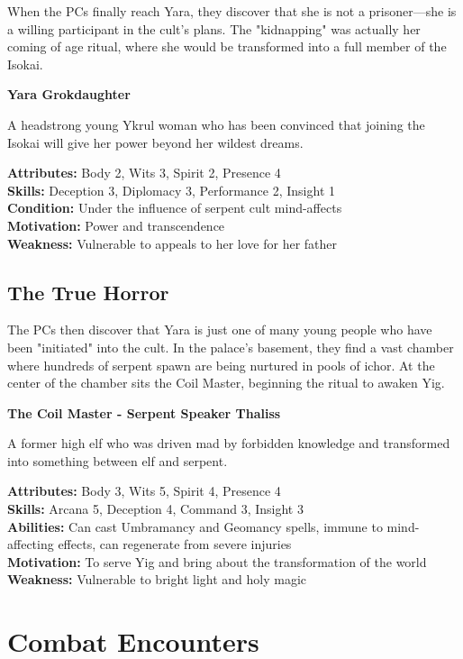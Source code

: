 \documentclass[12pt,twoside]{article}
\newenvironment{npcbox}[1]{
  \begin{mdframed}[
    linewidth=1pt,
    linecolor=dungeongray,
    backgroundcolor=white,
    innertopmargin=5pt,
    innerbottommargin=5pt,
    innerrightmargin=5pt,
    innerleftmargin=5pt
  ]
  \textbf{#1}
}{\end{mdframed}}
\begin{document}
When the PCs finally reach Yara, they discover that she is not a prisoner—she is a willing participant in the cult's plans. The "kidnapping" was actually her coming of age ritual, where she would be transformed into a full member of the Isokai.

\begin{npcbox}{Yara Grokdaughter}
A headstrong young Ykrul woman who has been convinced that joining the Isokai will give her power beyond her wildest dreams.

\textbf{Attributes:} Body 2, Wits 3, Spirit 2, Presence 4 \\
\textbf{Skills:} Deception 3, Diplomacy 3, Performance 2, Insight 1 \\
\textbf{Condition:} Under the influence of serpent cult mind-affects \\
\textbf{Motivation:} Power and transcendence \\
\textbf{Weakness:} Vulnerable to appeals to her love for her father
\end{npcbox}

\subsection{The True Horror}

The PCs then discover that Yara is just one of many young people who have been "initiated" into the cult. In the palace's basement, they find a vast chamber where hundreds of serpent spawn are being nurtured in pools of ichor. At the center of the chamber sits the Coil Master, beginning the ritual to awaken Yig.

\begin{npcbox}{The Coil Master - Serpent Speaker Thaliss}
A former high elf who was driven mad by forbidden knowledge and transformed into something between elf and serpent.

\textbf{Attributes:} Body 3, Wits 5, Spirit 4, Presence 4 \\
\textbf{Skills:} Arcana 5, Deception 4, Command 3, Insight 3 \\
\textbf{Abilities:} Can cast Umbramancy and Geomancy spells, immune to mind-affecting effects, can regenerate from severe injuries \\
\textbf{Motivation:} To serve Yig and bring about the transformation of the world \\
\textbf{Weakness:} Vulnerable to bright light and holy magic
\end{npcbox}

\section{Combat Encounters}
\end{document}
